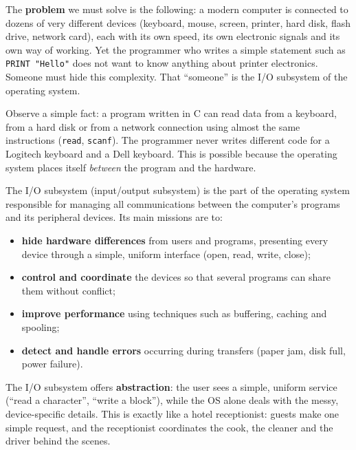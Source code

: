 \documentclass[11pt]{article}
\newcommand{\cle}[1]{{\popxbold\color{popdark}#1}}
\newcounter{popsec}
\newcounter{popsub}
\newcommand{\courssub}[1]{%
  \stepcounter{popsub}%
  \par\vspace{9pt}\noindent{\popxbold\fontsize{11.5}{13}\selectfont\color{popink}{\color{poporange}\thepopsec.\thepopsub}\hspace{6pt}#1}\par\nopagebreak\vspace{4pt}
}
\begin{document}
The \textbf{problem} we must solve is the following: a modern computer is connected to dozens of very different devices (keyboard, mouse, screen, printer, hard disk, flash drive, network card), each with its own speed, its own electronic signals and its own way of working. Yet the programmer who writes a simple statement such as \texttt{PRINT "Hello"} does not want to know anything about printer electronics. Someone must hide this complexity. That ``someone'' is the \cle{I/O subsystem} of the operating system.

\courssub{The Role of the I/O Subsystem}

Observe a simple fact: a program written in C can read data from a keyboard, from a hard disk or from a network connection using almost the same instructions (\texttt{read}, \texttt{scanf}). The programmer never writes different code for a Logitech keyboard and a Dell keyboard. This is possible because the operating system places itself \emph{between} the program and the hardware.

\begin{definition}[I/O Subsystem]
The \cle{I/O subsystem} (input/output subsystem) is the part of the operating system responsible for managing all communications between the computer's programs and its peripheral devices. Its main missions are to:
\begin{itemize}
\item \textbf{hide hardware differences} from users and programs, presenting every device through a simple, uniform interface (open, read, write, close);
\item \textbf{control and coordinate} the devices so that several programs can share them without conflict;
\item \textbf{improve performance} using techniques such as buffering, caching and spooling;
\item \textbf{detect and handle errors} occurring during transfers (paper jam, disk full, power failure).
\end{itemize}
\end{definition}

\begin{aretenir}
The I/O subsystem offers \textbf{abstraction}: the user sees a simple, uniform service (``read a character'', ``write a block''), while the OS alone deals with the messy, device-specific details. This is exactly like a hotel receptionist: guests make one simple request, and the receptionist coordinates the cook, the cleaner and the driver behind the scenes.
\end{aretenir}
\end{document}
